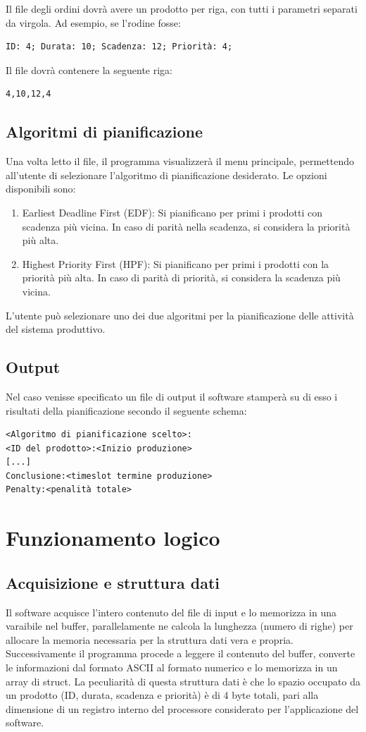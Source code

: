 \documentclass[a4paper]{report}
\begin{document}
Il file degli ordini dovrà avere un prodotto per riga, con tutti i parametri separati da virgola. Ad esempio, se l'rodine fosse:
\begin{verbatim}
ID: 4; Durata: 10; Scadenza: 12; Priorità: 4;
\end{verbatim}
Il file dovrà contenere la seguente riga:
\begin{verbatim}
4,10,12,4
\end{verbatim}


\subsection{Algoritmi di pianificazione}
Una volta letto il file, il programma visualizzerà il menu principale, permettendo all'utente di selezionare l'algoritmo di pianificazione desiderato. Le opzioni disponibili sono:

\begin{enumerate}
    \item Earliest Deadline First (EDF): Si pianificano per primi i prodotti con scadenza più vicina. In caso di parità nella scadenza, si considera la priorità più alta.
    \item Highest Priority First (HPF): Si pianificano per primi i prodotti con la priorità più alta. In caso di parità di priorità, si considera la scadenza più vicina.
\end{enumerate}

L'utente può selezionare uno dei due algoritmi per la pianificazione delle attività del sistema produttivo.

\subsection{Output}
Nel caso venisse specificato un file di output il software stamperà su di esso i risultati della pianificazione secondo il seguente schema:
\begin{verbatim}
<Algoritmo di pianificazione scelto>:
<ID del prodotto>:<Inizio produzione>
[...]
Conclusione:<timeslot termine produzione>
Penalty:<penalità totale>
\end{verbatim}


\section{Funzionamento logico}

\subsection{Acquisizione e struttura dati}
Il software acquisce l'intero contenuto del file di input e lo memorizza in una varaibile nel buffer, 
parallelamente ne calcola la lunghezza (numero di righe) per allocare la memoria necessaria per la struttura dati vera e propria.
Successivamente il programma procede a leggere il contenuto del buffer, converte le informazioni dal formato ASCII al formato numerico e lo memorizza in un array di struct.
La peculiarità di questa struttura dati è che lo spazio occupato da un prodotto (ID, durata, scadenza e priorità) è di 4 byte totali, pari alla dimensione di un registro interno del processore considerato per l'applicazione del software.
\end{document}
